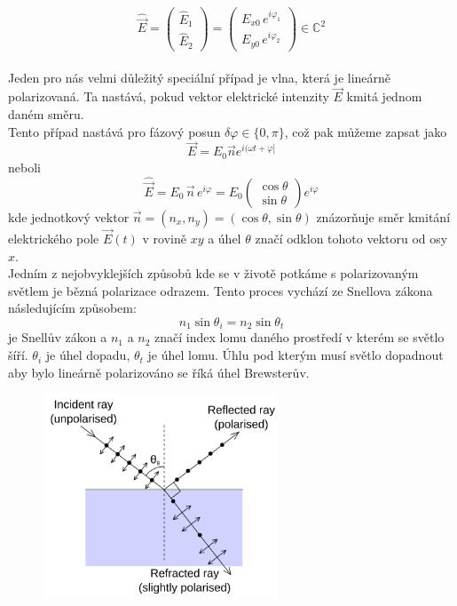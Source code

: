 \documentclass[a4paper]{article}
\numberwithin{equation}{section}
\begin{document}
    \begin{equation}
        \hat{\vec{E}} = \begin{pmatrix} \hat{E}_1 \\ \hat{E}_2 \end{pmatrix} = \begin{pmatrix} E_{x0} \, e^{i \varphi_1} \\ E_{y0} \, e^{i \varphi_2} \end{pmatrix}	 \in \mathbb{C}^2
    \end{equation}
    \\Jeden pro nás velmi důležitý speciální případ je vlna, která je lineárně polarizovaná. Ta nastává,
    pokud vektor elektrické intenzity $\vec{E}$ kmitá jednom daném směru. 
    \\Tento případ nastává pro fázový posun $\delta \varphi \in \{0,\pi\}$, což pak můžeme zapsat jako
    \begin{equation} \label{eq:7}
        \vec{E} = E_0 \vec{n} e^{i(\omega t + \varphi]}
    \end{equation}
    neboli 
    \begin{equation} 
        \hat{\vec{E}} = E_0 \, \vec{n} \, e^{i\varphi} = E_0 \begin{pmatrix} \cos \theta \\ \sin \theta \end{pmatrix} e^{i\varphi}
    \end{equation}
    kde jednotkový vektor $\vec{n} = (n_x,n_y) = (\cos \theta, \sin \theta)$ znázorňuje směr kmitání
    elektrického pole $\vec{E}(t)$ v rovině $xy$ a úhel $\theta$ značí odklon tohoto vektoru od osy $x$. \cite{schmidt}
    \\Jedním z nejobvyklejších způsobů kde se v životě potkáme s polarizovaným světlem je bězná polarizace odrazem. 
    Tento proces vychází ze Snellova zákona následujícím způsobem: 
    \begin{equation}
        n_1 \sin \theta_i = n_2 \sin \theta_t
    \end{equation}
    je Snellův zákon a $n_1$ a $n_2$ značí index lomu daného prostředí v kterém se světlo šíří. 
    $\theta_i$ je úhel dopadu, $\theta_t$ je úhel lomu. Úhlu pod kterým musí světlo dopadnout aby bylo lineárně
    polarizováno se říká úhel Brewsterův. 
    \begin{figure}[h]
        \includegraphics[width=7cm]{figures/Brewster.png}
        \centering
    \end{figure}
\end{document}
